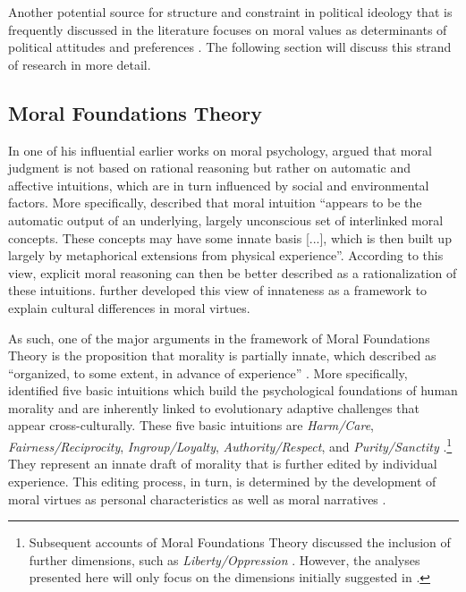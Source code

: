 \documentclass[12pt]{paper}
\begin{document}
Another potential source for structure and constraint in political ideology that is frequently discussed in the literature focuses on moral values as determinants of political attitudes and preferences \citep{lakoff1995metaphor,haidt2008moral,mcadams2008family}. The following section will discuss this strand of research in more detail.


\subsection{Moral Foundations Theory}

In one of his influential earlier works on moral psychology, \citet{haidt2001emotional} argued that moral judgment is not based on rational reasoning but rather on automatic and affective intuitions, which are in turn influenced by social and environmental factors. More specifically, \citet[825]{haidt2001emotional} described that moral intuition ``appears to be the automatic output of an underlying, largely unconscious set of interlinked moral concepts. These concepts may have some innate basis [...], which is then built up largely by metaphorical extensions from physical experience''. According to this view, explicit moral reasoning can then be better described as a rationalization of these intuitions. \citet{haidt2004intuitive} further developed this view of innateness as a framework to explain cultural differences in moral virtues.

As such, one of the major arguments in the framework of Moral Foundations Theory is the proposition that morality is partially innate, which \citet[367]{haidt2008moral} described as ``organized, to some extent, in advance of experience'' \citep[but see][]{suhler2011can}. More specifically, \citet{haidt2008moral} identified five basic intuitions which build the psychological foundations of human morality and are inherently linked to evolutionary adaptive challenges that appear cross-culturally. These five basic intuitions are \textit{Harm/Care}, \textit{Fairness/Reciprocity}, \textit{Ingroup/Loyalty}, \textit{Authority/Respect}, and \textit{Purity/Sanctity} \citep[see also][]{graham2011mapping}.\footnote{Subsequent accounts of Moral Foundations Theory discussed the inclusion of further dimensions, such as \textit{Liberty/Oppression} \citep[c.f.][]{graham2013moral,haidt2012righteous}. However, the analyses presented here will only focus on the dimensions initially suggested in \citet{haidt2008moral}.} They represent an innate draft of morality that is further edited by individual experience. This editing process, in turn, is determined by the development of moral virtues as personal characteristics as well as moral narratives \citep{haidt2008moral}.
\end{document}

